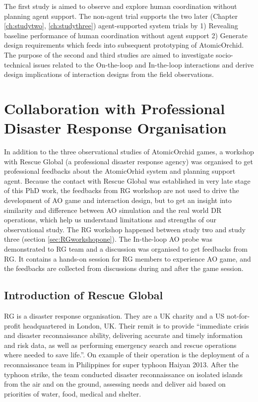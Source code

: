 The first study is aimed to observe and explore human coordination without planning agent support. The non-agent trial supports the two later (Chapter \ref{ch:studytwo}, \ref{ch:studythree}) agent-supported system trials by 1) Revealing baseline performance of human coordination without agent support 2) Generate design requirements which feeds into subsequent prototyping of AtomicOrchid. The purpose of the second and third studies are aimed to investigate socio-technical issues related to the On-the-loop and In-the-loop interactions and derive design implications of interaction designs from the field observations.\\

\section{Collaboration with Professional Disaster Response Organisation}
In addition to the three observational studies of AtomicOrchid games, a workshop with Rescue Global (a professional disaster response agency) was organised to get professional feedbacks about the AtomicOrhid system and planning support agent. Because the contact with Rescue Global was established in very late stage of this PhD work, the feedbacks from \ac{RG} workshop are not used to drive the development of \ac{AO} game and interaction design, but to get an insight into similarity and difference between \ac{AO} simulation and the real world \acf{DR} operations, which help us understand limitations and strengths of our observational study.  The \ac{RG} workshop happened between study two and study three (section \ref{sec:RGworkshopone}). The In-the-loop \ac{AO} probe was demonstrated to \ac{RG} team and a discussion was organised to get feedbacks from \ac{RG}. It contains a hands-on session for \ac{RG} members to experience AO game, and the feedbacks are collected from discussions during and after the game session.\\

\subsection{Introduction of Rescue Global}\label{sec:rg}
\acf{RG} is a disaster response organisation. They are a UK charity and a US not-for-profit headquartered in London, UK. Their remit is to provide ``immediate crisis and disaster reconnaissance ability, delivering accurate and timely information and risk data, as well as performing emergency search and rescue operations where needed to save life.''. On example of their operation is the deployment of a reconnaissance team in Philippines for super typhoon Haiyan 2013. After the typhoon strike, the team conducted disaster reconnaissance on isolated islands from the air and on the ground, assessing needs and deliver aid based on priorities of water, food, medical and shelter.\\

